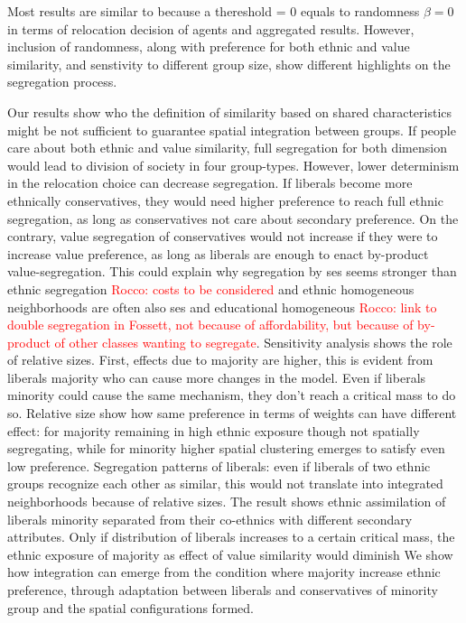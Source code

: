 \documentclass{article}
\newcommand{\rocco}[1]{{\textcolor{red}{Rocco: #1}}} %
\begin{document}

Most results are similar to \textcite{paolillo2018} because a thereshold = 0 equals to randomness $\beta = 0$ in terms of relocation decision of agents and aggregated results. However, inclusion of randomness, along with preference for both ethnic and value similarity, and senstivity to different group size, show different highlights on the segregation process.

Our results show who the definition of similarity based on shared characteristics might be not sufficient to guarantee spatial integration between groups. If people care about both ethnic and value similarity, full segregation for both dimension would lead to division of society in four group-types. However, lower determinism in the relocation choice can decrease segregation. If liberals become more ethnically conservatives, they would need higher preference to reach full ethnic segregation, as long as conservatives not care about secondary preference. On the contrary, value segregation of conservatives would not increase if they were to increase value preference, as long as liberals are enough to enact by-product value-segregation. This could explain why segregation by ses seems stronger than ethnic segregation \rocco{costs to be considered} and ethnic homogeneous neighborhoods are often also ses and educational homogeneous \rocco{link to double segregation in Fossett, not because of affordability, but because of by-product of other classes wanting to segregate}. Sensitivity analysis shows the role of relative sizes. First, effects due to majority are higher, this is evident from liberals majority who can cause more changes in the model. Even if liberals minority could cause the same mechanism, they don't reach a critical mass to do so. Relative size show how same preference in terms of weights can have different effect: for majority remaining in high ethnic exposure though not spatially segregating, while for minority higher spatial clustering emerges to satisfy even low preference. Segregation patterns of liberals: even if liberals of two ethnic groups recognize each other as similar, this would not translate into integrated neighborhoods because of relative sizes. The result shows ethnic assimilation of liberals minority separated from their co-ethnics with different secondary attributes. Only if distribution of liberals increases to a certain critical mass, the ethnic exposure of majority as effect of value similarity would diminish %
We show how integration can emerge from the condition where majority increase ethnic preference, through adaptation between liberals and conservatives of minority group  and the spatial configurations formed.
\end{document}
